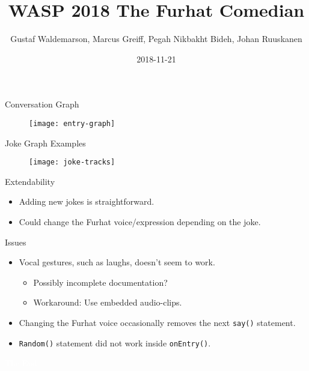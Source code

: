 \documentclass{beamer}
\title{WASP 2018 The Furhat Comedian}
\date{2018-11-21}
\author{Gustaf Waldemarson, Marcus Greiff, Pegah Nikbakht Bideh, Johan Ruuskanen}
\begin{document}
\begin{frame}
  \titlepage
\end{frame}


\begin{frame}{Conversation Graph}
  \begin{figure}[ht]
    \texttt{[image: entry-graph]}
  \end{figure}
\end{frame}


\begin{frame}{Joke Graph Examples}
  \begin{figure}[ht]
    \texttt{[image: joke-tracks]}
  \end{figure}
\end{frame}


\begin{frame}{Extendability}

  \begin{itemize}
  \item Adding new jokes is straightforward.
  \item Could change the Furhat voice/expression depending on the joke.
  \end{itemize}


\end{frame}


\begin{frame}{Issues}
  \begin{itemize}
  \item Vocal gestures, such as laughs, doesn't seem to work.
    \begin{itemize}
    \item Possibly incomplete documentation?
    \item Workaround: Use embedded audio-clips.
    \end{itemize}
  \item Changing the Furhat voice occasionally removes the next \texttt{say()}
    statement.
  \item \texttt{Random()} statement did not work inside \texttt{onEntry()}.
  \end{itemize}
\end{frame}


\bgroup
{}
\begin{frame}[t,plain]{}{}
  \begin{center}
    {\tiny \textcolor{white}{The End}}
  \end{center}
\end{frame}
\egroup
\end{document}
